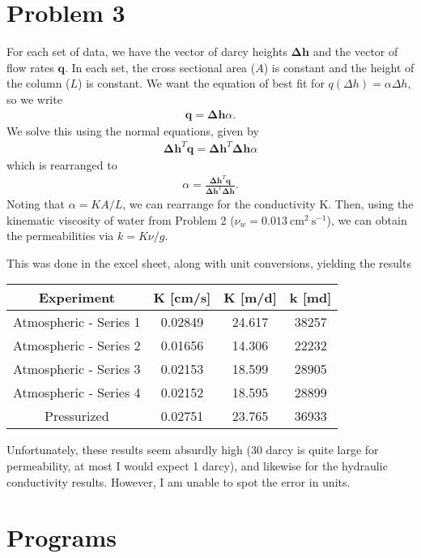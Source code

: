 \documentclass{article}
\begin{document}
\section{Problem 3}
For each set of data, we have the vector of darcy heights $\mathbf{\Delta h}$ and the vector of flow rates $\mathbf{q}$.
In each set, the cross sectional area ($A$) is constant and the height of the column ($L$) is constant.
We want the equation of best fit for $q(\Delta h) = \alpha \Delta h$, so we write
\begin{align}
    \mathbf{q} = \mathbf{\Delta h} \alpha.
\end{align}
We solve this using the normal equations, given by
\begin{align}
    \mathbf{\Delta h}^T \mathbf{q} = \mathbf{\Delta h}^T \mathbf{\Delta h} \alpha
\end{align}
which is rearranged to
\begin{align}
   \alpha = \frac{\mathbf{\Delta h}^T \mathbf{q}}{\mathbf{\Delta h}^T \mathbf{\Delta h}}.
\end{align}
Noting that $\alpha = KA/L$, we can rearrange for the conductivity K.
Then, using the kinematic viscosity of water from Problem 2 ($\nu_{w} = 0.013\mathrm{\ cm}^2 \mathrm{\ s}^{-1}$), we can obtain the permeabilities via $k = K\nu/g$.

This was done in the excel sheet, along with unit conversions, yielding the results
\begin{table}[!h]
\centering
\begin{tabular}{c | c c c}
Experiment & K [cm/s] & K [m/d] & k [md] \\
\hline
Atmospheric - Series 1 & 0.02849 & 24.617 & 38257 \\
Atmospheric - Series 2 & 0.01656 & 14.306 & 22232 \\
Atmospheric - Series 3 & 0.02153 & 18.599 & 28905 \\
Atmospheric - Series 4 & 0.02152 & 18.595 & 28899 \\
Pressurized & 0.02751 & 23.765 & 36933
\end{tabular}
\end{table}

Unfortunately, these results seem absurdly high (30 darcy is quite large for permeability, at most I would expect 1 darcy), and likewise for the hydraulic conductivity results.
However, I am unable to spot the error in units.

\appendix
\section{Programs}



\end{document}
